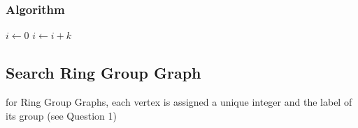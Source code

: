 \documentclass[11pt,a4paper,notitlepage]{article}
\begin{document}
\subsubsection*{Algorithm}

\begin{algorithmic}
        \State $i\gets 0$
    \Else
            \State $i\gets i+k$
        \EndIf
    \EndIf
\end{algorithmic}

\subsection*{Search Ring Group Graph}
for Ring Group Graphs, each vertex is assigned a unique integer and the label of its group (see
Question 1)
\end{document}
